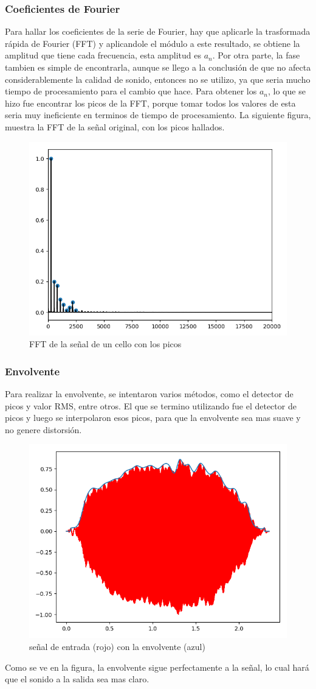 \documentclass[../ASSD_TP2.tex]{subfiles}
\begin{document}
\subsubsection*{Coeficientes de Fourier}
Para hallar los coeficientes de la serie de Fourier, hay que aplicarle la trasformada r\'apida de Fourier (FFT) y aplicandole el m\'odulo a este resultado, se obtiene la amplitud que tiene cada frecuencia, esta amplitud es $a_n$.
Por otra parte, la fase tambien es simple de encontrarla, aunque se llego a la conclusi\'on de que no afecta considerablemente la calidad de sonido, entonces no se utilizo, ya que seria mucho tiempo de procesamiento para el cambio que hace.
Para obtener los $a_n$, lo que se hizo fue encontrar los picos de la FFT, porque tomar todos los valores de esta seria muy ineficiente en terminos de tiempo de procesamiento.
La siguiente figura, muestra la FFT de la señal original, con los picos hallados.

\begin{figure}[H]
\centering
  \includegraphics[width=0.6\linewidth]{fft_with_peaks.png}
  \caption{FFT de la señal de un cello con los picos}
  \label{fig:fft}
\end{figure}

\subsubsection*{Envolvente}
Para realizar la envolvente, se intentaron varios m\'etodos, como el detector de picos y valor RMS, entre otros. El que se termino utilizando fue el detector de picos y luego se interpolaron esos picos, para que la envolvente sea mas suave y no genere distorsi\'on.
\begin{figure}[H]
\centering
  \includegraphics[width=0.6\linewidth]{envolvente.png}
  \caption{señal de entrada (rojo) con la envolvente (azul)}
  \label{fig:envolvente}
\end{figure}
Como se ve en la figura, la envolvente sigue perfectamente a la señal, lo cual har\'a que el sonido a la salida sea mas claro.
\end{document}
